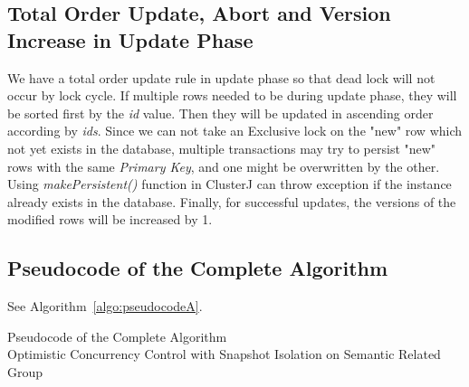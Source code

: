 \documentclass[runningheads,a4paper]{llncs}
\begin{document}
\subsection{Total Order Update, Abort and Version Increase in Update Phase}
We have a total order update rule in update phase so that dead lock will not occur by lock cycle. If multiple rows needed to be during update phase, they will be sorted first by the \textit{id} value. Then they will be updated in ascending order according by \textit{ids}. Since we can not take an Exclusive lock on the "new" row which not yet exists in the database, multiple transactions may try to persist "new" rows with the same \textit{Primary Key}, and one might be overwritten by the other. Using \textit{makePersistent()} function in ClusterJ can throw exception if the instance already exists in the database. Finally, for successful updates, the versions of the modified rows will be increased by 1.
\subsection{Pseudocode of the Complete Algorithm}
See Algorithm~\ref{algo:pseudocodeA}.
\begin{algorithm}[!h]
	\caption{Pseudocode of the Complete Algorithm \\ Optimistic Concurrency Control with Snapshot Isolation on Semantic Related Group}
	\label{algo:pseudocodeA}
	\begin{algorithmic}[1]
		
		\ELSE
		\ENDIF
		\ELSE
		\ENDIF
		\ENDWHILE
		
	\end{algorithmic}
\end{algorithm}
\end{document}
